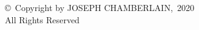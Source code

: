 
\thispagestyle{empty}
\addtocounter{page}{-1}
\vspace*{\fill}
\vfill
\begin{center}
\copyright\ Copyright by \MakeUppercase{Joseph Chamberlain},~2020\\
All Rights Reserved
\end{center}
\clearpage